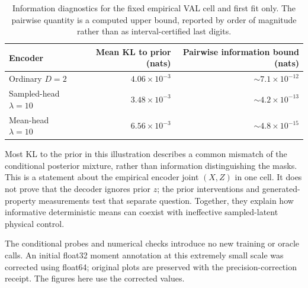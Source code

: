 \begin{table}[htbp]
\centering\small
\caption{Information diagnostics for the fixed empirical VAL cell and first
fit only. The pairwise quantity is a computed upper bound, reported by order
of magnitude rather than as interval-certified last digits.}
\begin{tabular}{lrr}\toprule
Encoder & Mean KL to prior (nats) & Pairwise information bound (nats)\\\midrule
Ordinary $D=2$ & $4.06\times10^{-3}$ & $\sim7.1\times10^{-12}$\\
Sampled-head $\lambda=10$ & $3.48\times10^{-3}$ & $\sim4.2\times10^{-13}$\\
Mean-head $\lambda=10$ & $6.56\times10^{-3}$ & $\sim4.8\times10^{-15}$\\\bottomrule
\end{tabular}
\end{table}

Most KL to the prior in this illustration describes a common mismatch of
the conditional posterior mixture, rather than information distinguishing
the masks. This is a statement about the empirical encoder joint
$(X,Z)$ in one cell. It does not prove that the decoder ignores prior $z$;
the prior interventions and generated-property measurements test that
separate question. Together, they explain how informative deterministic
means can coexist with ineffective sampled-latent physical control.

The conditional probes and numerical checks introduce no new training or
oracle calls. An initial float32 moment annotation at this extremely small
scale was corrected using float64; original plots are preserved with the
precision-correction receipt. The figures here use the corrected values.
